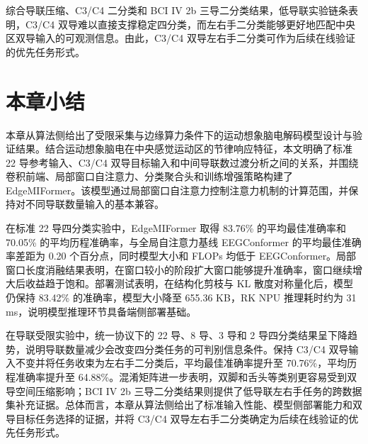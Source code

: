 综合导联压缩、C3/C4 二分类和 BCI IV 2b 三导二分类结果，低导联实验链条表明，C3/C4 双导难以直接支撑稳定四分类，而左右手二分类能够更好地匹配中央区双导输入的可观测信息。由此，C3/C4 双导左右手二分类可作为后续在线验证的优先任务形式。

\section{本章小结}

本章从算法侧给出了受限采集与边缘算力条件下的运动想象脑电解码模型设计与验证结果。结合运动想象脑电在中央感觉运动区的节律响应特征，本文明确了标准 22 导参考输入、C3/C4 双导目标输入和中间导联数过渡分析之间的关系，并围绕卷积前端、局部窗口自注意力、分类聚合头和训练增强策略构建了 EdgeMIFormer。该模型通过局部窗口自注意力控制注意力机制的计算范围，并保持对不同导联数量输入的基本兼容。

在标准 22 导四分类实验中，EdgeMIFormer 取得 83.76\% 的平均最佳准确率和 70.05\% 的平均历程准确率，与全局自注意力基线 EEGConformer 的平均最佳准确率差距为 0.20 个百分点，同时模型大小和 FLOPs 均低于 EEGConformer。局部窗口长度消融结果表明，在窗口较小的阶段扩大窗口能够提升准确率，窗口继续增大后收益趋于饱和。部署测试表明，在结构化剪枝与 KL 散度对称量化后，模型仍保持 83.42\% 的准确率，模型大小降至 655.36 KB，RK NPU 推理耗时约为 31 ms，说明模型推理环节具备端侧部署基础。

在导联受限实验中，统一协议下的 22 导、8 导、3 导和 2 导四分类结果呈下降趋势，说明导联数量减少会改变四分类任务的可判别信息条件。保持 C3/C4 双导输入不变并将任务收束为左右手二分类后，平均最佳准确率提升至 70.76\%，平均历程准确率提升至 64.88\%。混淆矩阵进一步表明，双脚和舌头等类别更容易受到双导空间压缩影响；BCI IV 2b 三导二分类结果则提供了低导联左右手任务的跨数据集补充证据。总体而言，本章从算法侧给出了标准输入性能、模型侧部署能力和双导目标任务选择的证据，并将 C3/C4 双导左右手二分类确定为后续在线验证的优先任务形式。

